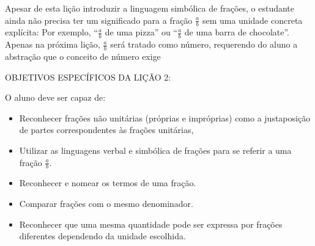 Apesar de esta lição introduzir a linguagem simbólica de frações, o estudante ainda não precisa ter um significado para a fração $\frac{a}{b}$ sem uma unidade concreta explícita: Por exemplo, ``$\frac{a}{b}$ de uma pizza'' ou ``$\frac{a}{b}$ de uma barra de chocolate''. Apenas na próxima lição, $\frac{a}{b}$ será tratado como número, requerendo do aluno a abstração que o conceito de número exige
\vspace{.15cm}

\noindent OBJETIVOS ESPECÍFICOS DA LIÇÃO 2:
\vspace{.15cm}

\noindent O aluno deve ser capaz de:
\begin{itemize}
 \item Reconhecer frações não unitárias (próprias e impróprias) como a justaposição de partes correspondentes às frações unitárias,  
  \item  Utilizar as linguagens verbal e simbólica de frações para se referir a uma fração $\frac{a}{b}$.
  \item  Reconhecer e nomear os termos de uma fração.
  \item  Comparar frações com o mesmo denominador.
  \item  Reconhecer que uma mesma quantidade pode ser expressa por frações diferentes dependendo da unidade escolhida.
\end{itemize}



